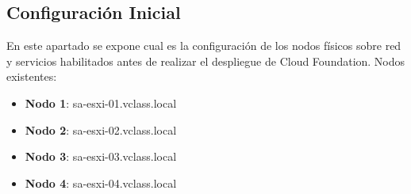 \subsection{Configuración Inicial}
En este apartado se expone cual es la configuración de los nodos físicos sobre red y servicios habilitados antes de realizar el despliegue de Cloud Foundation. Nodos existentes:
    \begin{itemize}
        \item \textbf{Nodo 1}: sa-esxi-01.vclass.local
        \item \textbf{Nodo 2}: sa-esxi-02.vclass.local
        \item \textbf{Nodo 3}: sa-esxi-03.vclass.local
        \item \textbf{Nodo 4}: sa-esxi-04.vclass.local
    \end{itemize}

